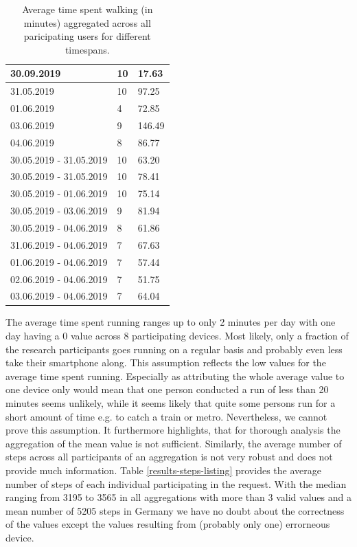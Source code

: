 \begin{table}[]
{\begin{tabular}{|l|l|l|}
			30.09.2019                 & 10         & 17.63                    \\ \hline
			31.05.2019                 & 10         & 97.25                    \\ \hline
			01.06.2019                 & 4          & 72.85                    \\ \hline
			03.06.2019                 & 9          & 146.49                   \\ \hline
			04.06.2019                 & 8          & 86.77                    \\ \hline
			30.05.2019 - 31.05.2019    & 10         & 63.20                    \\ \hline
			30.05.2019 - 31.05.2019    & 10         & 78.41                    \\ \hline
			30.05.2019 - 01.06.2019    & 10         & 75.14                    \\ \hline
			30.05.2019 - 03.06.2019    & 9          & 81.94                    \\ \hline
			30.05.2019 - 04.06.2019    & 8          & 61.86                    \\ \hline
			31.06.2019 - 04.06.2019    & 7          & 67.63                    \\ \hline
			01.06.2019 - 04.06.2019    & 7          & 57.44                    \\ \hline
			02.06.2019 - 04.06.2019    & 7          & 51.75                    \\ \hline
			03.06.2019 - 04.06.2019    & 7          & 64.04                    \\ \hline
		\end{tabular}
		\caption{Average time spent walking (in minutes) aggregated across all paricipating users for different timespans.}
		\label{results-walking}
	}
\end{table}

The average time spent running ranges up to only 2 minutes per day with one day having a 0 value across 8 participating devices. Most likely, only a fraction of the research participants goes running on a regular basis and probably even less take their smartphone along. This assumption reflects the low values for the average time spent running. Especially as attributing the whole average value to one device only would mean that one person conducted a run of less than 20 minutes seems unlikely, while it seems likely that quite some persons run for a short amount of time e.g. to catch a train or metro. Nevertheless, we cannot prove this assumption. It furthermore highlights, that for thorough analysis the aggregation of the mean value is not sufficient.
Similarly, the average number of steps across all participants of an aggregation is not very robust and does not provide much information. Table \ref{results-steps-listing} provides the average number of steps of each individual participating in the request. With the median ranging from 3195 to 3565 in all aggregations with more than 3 valid values and a mean number of 5205 steps in Germany \parencite{steps3} we have no doubt about the correctness of the values except the values resulting from (probably only one) errorneous device.

